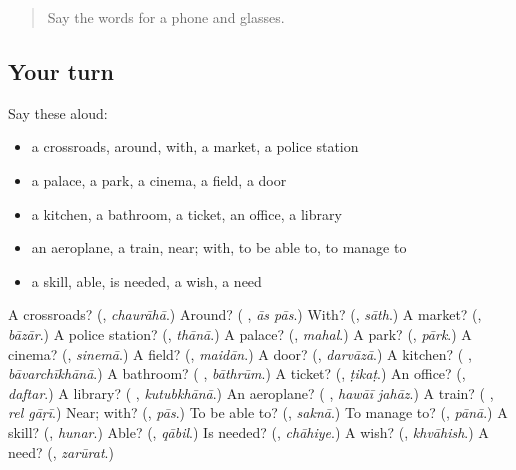 \label{lesson:UR-R110-first-pass-places-can-and-want}



\begin{quote}
Say the words for a phone and glasses.
\end{quote}

\subsection*{Your turn}
Say these aloud:

\begin{itemize}
\raggedright
  \item a crossroads, around, with, a market, a police station
  \item a palace, a park, a cinema, a field, a door
  \item a kitchen, a bathroom, a ticket, an office, a library
  \item an aeroplane, a train, near; with, to be able to, to manage to
  \item a skill, able, is needed, a wish, a need
\end{itemize}

\begin{tcolorbox}[breakable,colback=teal!4,colframe=teal!35!black,title={Before you move on}]
A crossroads? (\textbf{}, \emph{chaurāhā}.) Around? (\textbf{ }, \emph{ās pās}.) With? (\textbf{}, \emph{sāth}.) A market? (\textbf{}, \emph{bāzār}.) A police station? (\textbf{}, \emph{thānā}.) A palace? (\textbf{}, \emph{mahal}.) A park? (\textbf{}, \emph{pārk}.) A cinema? (\textbf{}, \emph{sinemā}.) A field? (\textbf{}, \emph{maidān}.) A door? (\textbf{}, \emph{darvāzā}.) A kitchen? (\textbf{ }, \emph{bāvarchīkhānā}.) A bathroom? (\textbf{ }, \emph{bāthrūm}.) A ticket? (\textbf{}, \emph{ṭikaṭ}.) An office? (\textbf{}, \emph{daftar}.) A library? (\textbf{ }, \emph{kutubkhānā}.) An aeroplane? (\textbf{ }, \emph{hawāī jahāz}.) A train? (\textbf{ }, \emph{rel gāṛī}.) Near; with? (\textbf{}, \emph{pās}.) To be able to? (\textbf{}, \emph{saknā}.) To manage to? (\textbf{}, \emph{pānā}.) A skill? (\textbf{}, \emph{hunar}.) Able? (\textbf{}, \emph{qābil}.) Is needed? (\textbf{}, \emph{chāhiye}.) A wish? (\textbf{}, \emph{khvāhish}.) A need? (\textbf{}, \emph{zarūrat}.)
\end{tcolorbox}
